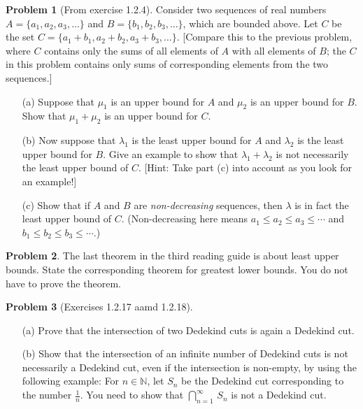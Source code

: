 \documentclass[12pt]{article}
\newcommand{\N}{{\mathbb N}}
\theoremstyle{definition}
\newtheorem{problem}{Problem}
\newenvironment{answer}{\par\medskip\bgroup\color{darkblue}}{\egroup\par\medskip}
\begin{document}
\begin{problem}[From exercise 1.2.4]  %
Consider two sequences of real numbers $A=\{a_1,a_2,a_3,\dots\}$ and $B=\{b_1,b_2,b_3,\dots\}$,
which are bounded above.  Let $C$ be the set $C=\{a_1+b_1,a_2+b_2,a_3+b_3,\dots\}$.
[Compare this to the previous problem,
where $C$ contains only the sums of all elements of $A$ with all elements of $B$;
the $C$ in this problem contains only sums of corresponding elements from the two sequences.]
    \begin{enumerate}
    \item[(a)] Suppose that $\mu_1$ is an upper bound for $A$ and $\mu_2$ is an upper bound
        for $B$.  Show that $\mu_1+\mu_2$ is an upper bound for $C$.
    \item[(b)] Now suppose that $\lambda_1$ is the least upper bound for $A$ and
        $\lambda_2$ is the least upper bound for $B$.  Give an example to show that
        $\lambda_1+\lambda_2$ is not necessarily the least upper bound of $C$.
        [Hint: Take part (c) into account as you look for an example!]
    \item[(c)] Show that if $A$ and $B$ are \textit{non-decreasing} sequences, then
        $\lambda$ is in fact the least upper bound of $C$.  (Non-decreasing here means
        $a_1\le a_2\le a_3\le\cdots$ and $b_1\le b_2\le b_3\le\cdots$.)
    \end{enumerate}
\end{problem}

\begin{answer}
\end{answer}



\begin{problem}  %
The last theorem in the third reading guide is about least upper bounds.  State the
corresponding theorem for greatest lower bounds.  You do not have to prove the theorem.
\end{problem}

\begin{answer}
\end{answer}



\begin{problem}[Exercises 1.2.17 aamd 1.2.18]\  %
   \begin{enumerate}
   \item[(a)] Prove that the intersection of two Dedekind cuts is again a Dedekind cut.
   \item[(b)] Show that the intersection of an infinite number of Dedekind cuts is
     not necessarily a Dedekind cut, even if the intersection is non-empty, by using
     the following example:  For $n\in\N$, let $S_n$ be the Dedekind cut corresponding
     to the number $\frac{1}{n}$.  You need to show that
     $\bigcap_{n=1}^\infty\,S_n$ is not a Dedekind cut.
    \end{enumerate}
\end{problem}

\begin{answer}
\end{answer}
\end{document}
